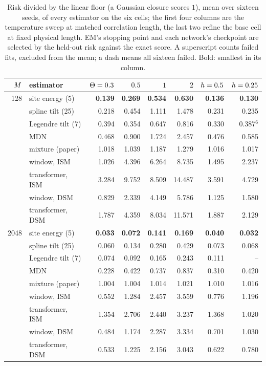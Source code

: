 \begin{table}[t]
\setlength{\tabcolsep}{6pt}
\centering
\footnotesize
\caption{Risk divided by the linear floor (a Gaussian closure scores $1$), mean over sixteen seeds, of every estimator on the six cells; the first four columns are the temperature sweep at matched correlation length, the last two refine the base cell at fixed physical length. EM's stopping point and each network's checkpoint are selected by the held-out risk against the exact score. A superscript counts failed fits, excluded from the mean; a dash means all sixteen failed. Bold: smallest in its column.}
\label{tab:fieldscore}
\begin{tabular}{@{}rlrrrrrr@{}}
\toprule
$M$ & estimator & $\Theta=0.3$ & $0.5$ & $1$ & $2$ & $h=0.5$ & $h=0.25$ \\
\midrule
128 & site energy (5) & \textbf{0.139} & \textbf{0.269} & \textbf{0.534} & \textbf{0.630} & \textbf{0.136} & \textbf{0.130} \\
 & spline tilt (25) & 0.218 & 0.454 & 1.111 & 1.478 & 0.231 & 0.235 \\
 & Legendre tilt (7) & 0.394 & 0.354 & 0.647 & 0.816 & 0.330 & 0.387$^{6}$ \\
 & MDN & 0.468 & 0.900 & 1.724 & 2.457 & 0.476 & 0.585 \\
 & mixture (paper) & 1.018 & 1.039 & 1.187 & 1.279 & 1.016 & 1.017 \\
 & window, ISM & 1.026 & 4.396 & 6.264 & 8.735 & 1.495 & 2.237 \\
 & transformer, ISM & 3.284 & 9.752 & 8.509 & 14.487 & 3.591 & 4.729 \\
 & window, DSM & 0.829 & 2.339 & 4.149 & 5.786 & 1.125 & 1.580 \\
 & transformer, DSM & 1.787 & 4.359 & 8.034 & 11.571 & 1.887 & 2.129 \\
\midrule
2048 & site energy (5) & \textbf{0.033} & \textbf{0.072} & \textbf{0.141} & \textbf{0.169} & \textbf{0.040} & \textbf{0.032} \\
 & spline tilt (25) & 0.060 & 0.134 & 0.280 & 0.429 & 0.073 & 0.068 \\
 & Legendre tilt (7) & 0.074 & 0.092 & 0.165 & 0.243 & 0.111 & -- \\
 & MDN & 0.228 & 0.422 & 0.737 & 0.837 & 0.310 & 0.420 \\
 & mixture (paper) & 1.004 & 1.004 & 1.014 & 1.021 & 1.010 & 1.016 \\
 & window, ISM & 0.552 & 1.284 & 2.457 & 3.559 & 0.776 & 1.196 \\
 & transformer, ISM & 1.354 & 2.706 & 2.440 & 3.237 & 1.368 & 1.020 \\
 & window, DSM & 0.484 & 1.174 & 2.287 & 3.334 & 0.701 & 1.030 \\
 & transformer, DSM & 0.533 & 1.225 & 2.156 & 3.043 & 0.622 & 0.780 \\
\bottomrule
\end{tabular}
\end{table}
